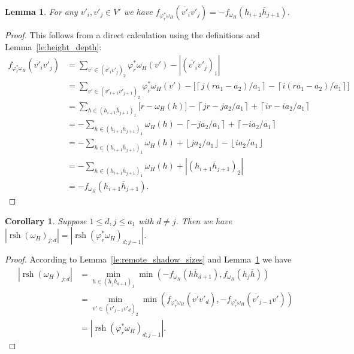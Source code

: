 \documentclass{amsart}
\newtheorem{corollary}[theorem]{Corollary}
\newtheorem{lemma}[theorem]{Lemma}
\newcommand{\rsh}{\operatorname{rsh}}
\begin{document}
 \begin{lemma}\label{le:f_and_varphi}
  For any $v'_i,v'_j\in V'$ we have $f_{\varphi^*_r\omega_H}(\overline{v'}_iv'_j)=-f_{\omega_H}(h_{i+1}\overline{h}_{j+1})$.
 \end{lemma}
 \begin{proof}
  This follows from a direct calculation using the definitions and Lemma~\ref{le:height_depth}:
  \begin{align*}
   f_{\varphi^*_r\omega_H}(\overline{v'}_iv'_j)
   &=\sum\limits_{v'\in(\overline{v'}_iv'_j)_2}\varphi^*_r\omega_H(v')-|(\overline{v'}_iv'_j)_1|\\
   &=\sum\limits_{v'\in(v'_{i+1}\overline{v'}_{j+1})_2}\varphi^*_r\omega_H(v')-\big[\left\lceil j(ra_1-a_2)/a_1\right\rceil-\left\lceil i(ra_1-a_2)/a_1\right\rceil\big]\\
   &=\sum\limits_{h\in(h_{i+1}\overline{h}_{j+1})_1}\big[r-\omega_H(h)\big]-\left\lceil jr-ja_2/a_1\right\rceil+\left\lceil ir-ia_2/a_1\right\rceil\\
   &=-\sum\limits_{h\in(h_{i+1}\overline{h}_{j+1})_1}\omega_H(h)-\left\lceil -ja_2/a_1\right\rceil+\left\lceil -ia_2/a_1\right\rceil\\
   &=-\sum\limits_{h\in(h_{i+1}\overline{h}_{j+1})_1}\omega_H(h)+\left\lfloor ja_2/a_1\right\rfloor-\left\lfloor ia_2/a_1\right\rfloor\\
   &=-\sum\limits_{h\in(h_{i+1}\overline{h}_{j+1})_1}\omega_H(h)+|(h_{i+1}\overline{h}_{j+1})_2|\\
   &=-f_{\omega_H}(h_{i+1}\overline{h}_{j+1}).
  \end{align*}
 \end{proof}

 \begin{corollary}
  Suppose $1\le d,j\le a_1$ with $d\ne j$.  Then we have $|\rsh(\omega_H)_{j;d}|=|\rsh(\varphi^*_r\omega_H)_{d;j-1}|$.
 \end{corollary}
 \begin{proof}
  According to Lemma~\ref{le:remote_shadow_sizes} and Lemma~\ref{le:f_and_varphi} we have
  \begin{align*}
   |\rsh(\omega_H)_{j;d}|
   &=\min\limits_{h\in (\overline{h}_j\overline{h}_{d+1})_1}\min\left(-f_{\omega_H}(h\overline{h}_{d+1}),f_{\omega_H}(h_j\overline{h})\right)\\
   &=\min\limits_{v'\in (\overline{v'}_{j-1}\overline{v'}_d)_2}\min\left(f_{\varphi^*_r\omega_H}(\overline{v'}v'_d),-f_{\varphi^*_r\omega_H}(\overline{v'}_{j-1} v')\right)\\
   &=|\rsh(\varphi^*_r\omega_H)_{d;j-1}|.
  \end{align*}
 \end{proof}
\end{document}
